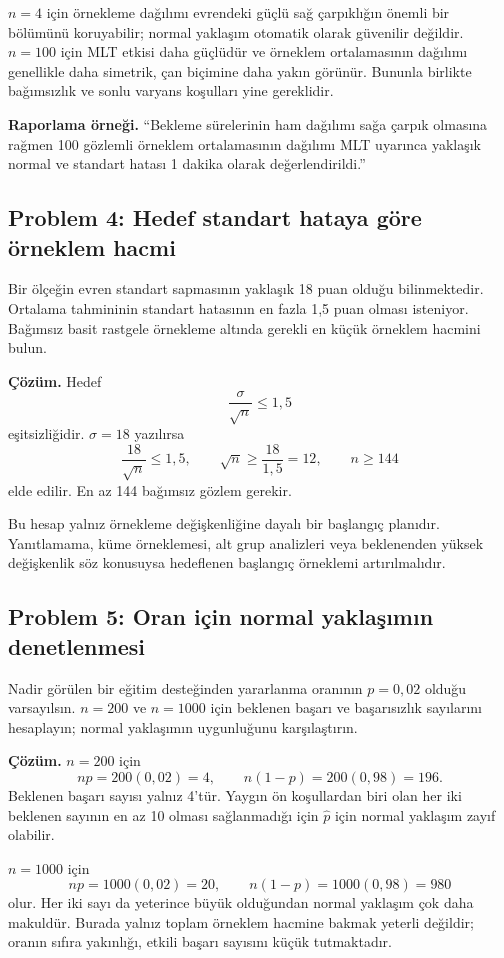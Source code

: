 $n=4$ için örnekleme dağılımı evrendeki güçlü sağ çarpıklığın önemli bir
bölümünü koruyabilir; normal yaklaşım otomatik olarak güvenilir değildir.
$n=100$ için MLT etkisi daha güçlüdür ve örneklem ortalamasının dağılımı
genellikle daha simetrik, çan biçimine daha yakın görünür. Bununla birlikte
bağımsızlık ve sonlu varyans koşulları yine gereklidir.

\textbf{Raporlama örneği.} ``Bekleme sürelerinin ham dağılımı sağa çarpık
olmasına rağmen 100 gözlemli örneklem ortalamasının dağılımı MLT uyarınca
yaklaşık normal ve standart hatası 1 dakika olarak değerlendirildi.''

\subsection*{Problem 4: Hedef standart hataya göre örneklem hacmi}

Bir ölçeğin evren standart sapmasının yaklaşık 18 puan olduğu bilinmektedir.
Ortalama tahmininin standart hatasının en fazla 1,5 puan olması isteniyor.
Bağımsız basit rastgele örnekleme altında gerekli en küçük örneklem hacmini
bulun.

\textbf{Çözüm.} Hedef
\[
\frac{\sigma}{\sqrt n}\leq1{,}5
\]
eşitsizliğidir. $\sigma=18$ yazılırsa
\[
\frac{18}{\sqrt n}\leq1{,}5,
\qquad
\sqrt n\geq\frac{18}{1{,}5}=12,
\qquad n\geq144
\]
elde edilir. En az 144 bağımsız gözlem gerekir.

Bu hesap yalnız örnekleme değişkenliğine dayalı bir başlangıç planıdır.
Yanıtlamama, küme örneklemesi, alt grup analizleri veya beklenenden yüksek
değişkenlik söz konusuysa hedeflenen başlangıç örneklemi artırılmalıdır.

\subsection*{Problem 5: Oran için normal yaklaşımın denetlenmesi}

Nadir görülen bir eğitim desteğinden yararlanma oranının $p=0{,}02$ olduğu
varsayılsın. $n=200$ ve $n=1000$ için beklenen başarı ve başarısızlık
sayılarını hesaplayın; normal yaklaşımın uygunluğunu karşılaştırın.

\textbf{Çözüm.} $n=200$ için
\[
np=200(0{,}02)=4,
\qquad n(1-p)=200(0{,}98)=196.
\]
Beklenen başarı sayısı yalnız 4'tür. Yaygın ön koşullardan biri olan her iki
beklenen sayının en az 10 olması sağlanmadığı için $\hat p$ için normal
yaklaşım zayıf olabilir.

$n=1000$ için
\[
np=1000(0{,}02)=20,
\qquad n(1-p)=1000(0{,}98)=980
\]
olur. Her iki sayı da yeterince büyük olduğundan normal yaklaşım çok daha
makuldür. Burada yalnız toplam örneklem hacmine bakmak yeterli değildir;
oranın sıfıra yakınlığı, etkili başarı sayısını küçük tutmaktadır.

